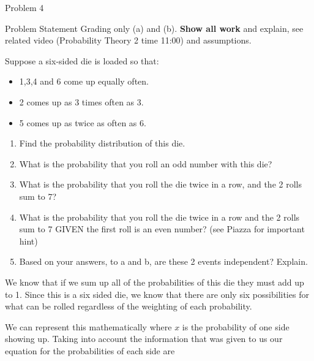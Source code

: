 \begin{problem}{Problem 4}
    \begin{statement}{Problem Statement}
        Grading only (a) and (b). \textbf{Show all work} and explain, see related video (Probability Theory 2 time 11:00) and assumptions. \vspace*{1em}

        Suppose a six-sided die is loaded so that:

        \begin{itemize}
            \item 1,3,4 and 6 come up equally often.
            \item 2 comes up as 3 times often as 3.
            \item 5 comes up as twice as often as 6.
        \end{itemize}

        \begin{enumerate}[label = (\alph*)]
            \item Find the probability distribution of this die.
            \item What is the probability that you roll an odd number with this die?
            \item What is the probability that you roll the die twice in a row, and the 2 rolls sum to 7?
            \item What is the probability that you roll the die twice in a row and the 2 rolls sum to 7 GIVEN the first roll is an even number? (see Piazza for important hint)
            \item Based on your answers, to a and b, are these 2 events independent? Explain.
        \end{enumerate}
    \end{statement}

    \begin{highlight}
        We know that if we sum up all of the probabilities of this die they must add up to 1. Since this is a six sided die, we know that there are only six possibilities for what can be rolled regardless
        of the weighting of each probability.

        We can represent this mathematically where $x$ is the probability of one side showing up. Taking into account the information that was given to us our equation for the probabilities of each side
        are


\end{highlight}
\end{problem}
